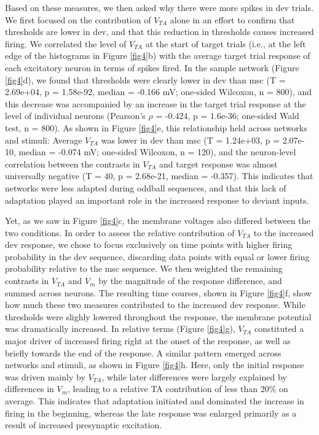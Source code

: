 \documentclass[pdflatex,referee,iicol,sn-basic]{sn-jnl}
\theoremstyle{thmstyleone}%
\theoremstyle{thmstyletwo}%
\theoremstyle{thmstylethree}%
\begin{document}
Based on these measures, we then asked why there were more spikes in dev trials. We first focused on the contribution of $V_{TA}$ alone in an effort to confirm that thresholds are lower in dev, and that this reduction in thresholds causes increased firing. We correlated the level of $V_{TA}$ at the start of target trials (i.e., at the left edge of the histograms in Figure \ref{fig4}b) with the average target trial response of each excitatory neuron in terms of spikes fired. In the sample network (Figure \ref{fig4}d), we found that thresholds were clearly lower in dev than msc (T = 2.69e+04, p = 1.58e-92, median = -0.166 mV; one-sided Wilcoxon, n = 800), and this decrease was accompanied by an increase in the target trial response at the level of individual neurons (Pearson's $\rho$ = -0.424, p = 1.6e-36; one-sided Wald test, n = 800). As shown in Figure \ref{fig4}e, this relationship held across networks and stimuli: Average $V_{TA}$ was lower in dev than msc (T = 1.24e+03, p = 2.07e-10, median = -0.074 mV; one-sided Wilcoxon, n = 120), and the neuron-level correlation between the contrasts in $V_{TA}$ and target response was almost universally negative (T = 40, p = 2.68e-21, median = -0.357). This indicates that networks were less adapted during oddball sequences, and that this lack of adaptation played an important role in the increased response to deviant inputs.

Yet, as we saw in Figure \ref{fig4}c, the membrane voltages also differed between the two conditions. In order to assess the relative contribution of $V_{TA}$ to the increased dev response, we chose to focus exclusively on time points with higher firing probability in the dev sequence, discarding data points with equal or lower firing probability relative to the msc sequence. We then weighted the remaining contrasts in $V_{TA}$ and $V_m$ by the magnitude of the response difference, and summed across neurons. The resulting time courses, shown in Figure \ref{fig4}f, show how much these two measures contributed to the increased dev response. While thresholds were slighly lowered throughout the response, the membrane potential was dramatically increased. In relative terms (Figure \ref{fig4}g), $V_{TA}$ constituted a major driver of increased firing right at the onset of the response, as well as briefly towards the end of the response. A similar pattern emerged across networks and stimuli, as shown in Figure \ref{fig4}h. Here, only the initial response was driven mainly by $V_{TA}$, while later differences were largely explained by differences in $V_m$, leading to a relative TA contribution of less than 20\% on average. This indicates that adaptation initiated and dominated the increase in firing in the beginning, whereas the late response was enlarged primarily as a result of increased presynaptic excitation.
\end{document}
